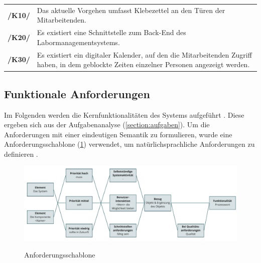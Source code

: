 \begin{center}
        \renewcommand{\arraystretch}{1.5}
        \begin{tabular}{p{}p{}}
                \hline
                \textbf{/K10/} & Das aktuelle Vorgehen umfasst Klebezettel an den Türen der Mitarbeitenden.                                                                  \\
                \textbf{/K20/} & Es existiert eine Schnittstelle zum Back-End des Labormanagementsystems.                                                                    \\
                \textbf{/K30/} & Es existiert ein digitaler Kalender, auf den die Mitarbeitenden Zugriff haben, in dem geblockte Zeiten einzelner Personen angezeigt werden. \\
                \hline
        \end{tabular}
\end{center}

\subsection*{Funktionale Anforderungen}
\label{section:funktionale}
Im Folgenden werden die Kernfunktionalitäten des Systems aufgeführt \cite{balzert2009}.
Diese ergeben sich aus der Aufgabenanalyse (\ref{section:aufgaben}). Um die Anforderungen mit einer eindeutigen Semantik zu formulieren, wurde eine Anforderungsschablone (\ref{fig:schablone}) verwendet, um natürlichsprachliche Anforderungen zu definieren \cite{balzert2009}.

\begin{figure}[h]
        \centering
        \includegraphics[scale=0.45]{Bilder/anforderungsschablone.pdf}
        \label{fig:schablone}
        \caption[Anforderungsschablone]{Anforderungsschablone \cite{balzert2009}}
\end{figure}

